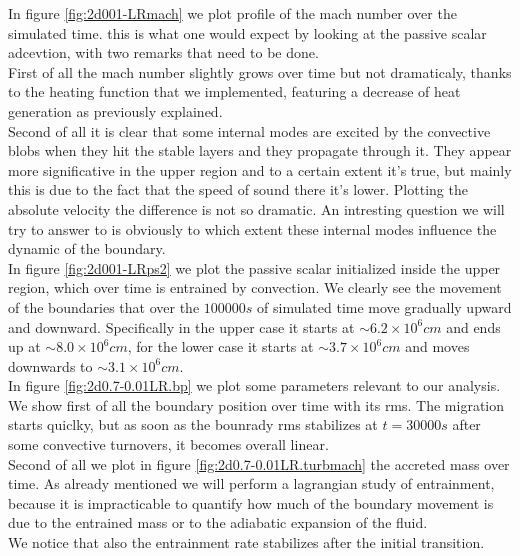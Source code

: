 In figure \ref{fig:2d001-LRmach} we plot profile of the mach number over the simulated time. this is what one would expect by looking at the passive scalar adcevtion, with two remarks that need to be done. \\
First of all the mach number slightly grows over time but not dramaticaly, thanks to the heating function that we implemented, featuring a decrease of heat generation as previously explained. \\
Second of all it is clear that some internal modes are excited by the convective blobs when they hit the stable layers and they propagate through it. They appear more significative in the upper region and to a certain extent it's true, but mainly this is due to the fact that the speed of sound there it's lower. Plotting the absolute velocity the difference is not so dramatic. An intresting question we will try to answer to is obviously to which extent these internal modes influence the dynamic of the boundary. \\
In figure \ref{fig:2d001-LRps2} we plot the passive scalar initialized inside the upper region, which over time is entrained by convection. We clearly see the movement of the boundaries that over the $100000 s$ of simulated time move gradually upward and downward. Specifically in the upper case it starts at $\sim 6.2 \times 10^{6} cm $ and ends up at $\sim 8.0 \times 10^{6} cm$, for the lower case it starts at $\sim 3.7 \times 10^{6} cm$ and moves downwards to $\sim 3.1 \times 10^{6} cm$. \\
In figure \ref{fig:2d0.7-0.01LR.bp} we plot some parameters relevant to our analysis. \\
We show first of all the boundary position over time with its rms. The migration starts quiclky, but as soon as the bounrady rms stabilizes at $t=30000 s$ after some convective turnovers, it becomes overall linear. \\
Second of all we plot in figure \ref{fig:2d0.7-0.01LR.turbmach} the accreted mass over time. As already mentioned we will perform a lagrangian study of entrainment, because it is impracticable to quantify how much of the boundary movement is due to the entrained mass or to the adiabatic expansion of the fluid. \\ We notice that also the entrainment rate stabilizes after the initial transition.
